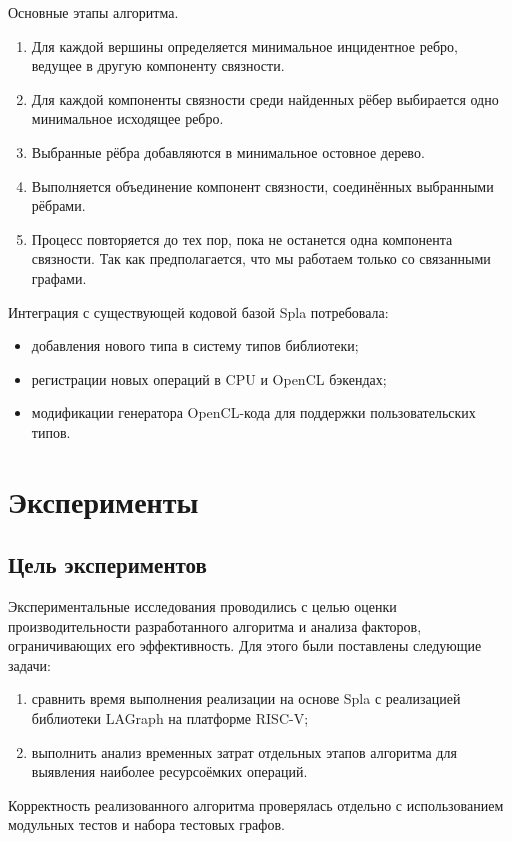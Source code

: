 \documentclass[a4paper]{article}
\begin{document}
Основные этапы алгоритма.
\begin{enumerate}
    \item Для каждой вершины определяется минимальное инцидентное ребро, ведущее в другую компоненту связности.
    \item Для каждой компоненты связности среди найденных рёбер выбирается одно минимальное исходящее ребро.
    \item Выбранные рёбра добавляются в минимальное остовное дерево.
    \item Выполняется объединение компонент связности, соединённых выбранными рёбрами.
    \item Процесс повторяется до тех пор, пока не останется одна компонента связности. Так как предполагается, что мы работаем только со связанными графами.
\end{enumerate}

Интеграция с существующей кодовой базой Spla потребовала:
\begin{itemize}
    \item добавления нового типа в систему типов библиотеки;
    \item регистрации новых операций в CPU и OpenCL бэкендах;
    \item модификации генератора OpenCL-кода для поддержки пользовательских типов.
\end{itemize}

\section{Эксперименты}
\subsection{Цель экспериментов}

Экспериментальные исследования проводились с целью оценки производительности разработанного алгоритма и анализа факторов, ограничивающих его эффективность. Для этого были поставлены следующие задачи:

\begin{enumerate}
\item сравнить время выполнения реализации на основе Spla с реализацией библиотеки LAGraph на платформе RISC-V;
\item выполнить анализ временных затрат отдельных этапов алгоритма для выявления наиболее ресурсоёмких операций.
\end{enumerate}

Корректность реализованного алгоритма проверялась отдельно с использованием модульных тестов и набора тестовых графов.
\end{document}
